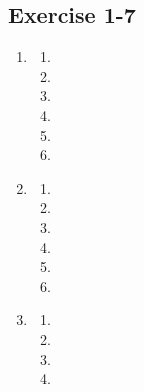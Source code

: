\subsection{Exercise 1-7} %
\begin{enumerate}[itemsep=5pt, label=\textbf{\arabic*}. ] 
\item %
\begin{multicols}{2}
\begin{enumerate}[itemsep=5pt, label=\textbf{(\alph*)} ] 
\item %
\item %
\item %
\item %
\item %
\item %
\end{enumerate}
\end{multicols}


\item %
\begin{multicols}{2}
\begin{enumerate}[itemsep=5pt, label=\textbf{(\alph*)} ]  
\item %
\item %
\item %
\item %
\item %
\item %
\end{enumerate}
\end{multicols}


\item %
\begin{multicols}{2}
\begin{enumerate}[itemsep=5pt, label=\textbf{(\alph*)} ] 

\item %
\item %
\item %
\item %
\end{enumerate}
\end{multicols}


\end{enumerate}
